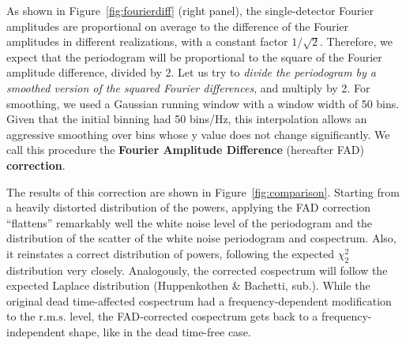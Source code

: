\documentclass[twocolumn]{aastex61}
\newcommand{\rms}{\ensuremath{\mathrm{r.m.s.}}\xspace}
\begin{document}
As shown in Figure~\ref{fig:fourierdiff} (right panel), the single-detector Fourier amplitudes are proportional on average to the difference of the Fourier amplitudes in different realizations, with a constant factor $1/\sqrt{2}$.
Therefore, we expect that the periodogram will be proportional to the square of the Fourier amplitude difference, divided by 2.
Let us try to \textit{divide the periodogram by a smoothed version of the squared Fourier differences}, and multiply by 2.
For smoothing, we used a Gaussian running window with a window width of 50 bins.
Given that the initial binning had 50 bins/Hz, this interpolation allows an aggressive smoothing over bins whose y value does not change significantly.
We call this procedure the \textbf{Fourier Amplitude Difference} (hereafter FAD) \textbf{correction}.

The results of this correction are shown in Figure~\ref{fig:comparison}. 
Starting from a heavily distorted distribution of the powers, applying the FAD correction ``flattens'' remarkably well the white noise level of the periodogram and the distribution of the scatter of the white noise periodogram and cospectrum. 
Also, it reinstates a correct distribution of powers, following the expected $\chi^2_2$ distribution \citep{Lewin+88} very closely. 
Analogously, the corrected cospectrum will follow the expected Laplace distribution (Huppenkothen \& Bachetti, sub.).
While the original dead time-affected cospectrum had a frequency-dependent modification to the \rms level, the FAD-corrected cospectrum gets back to a frequency-independent shape, like in the dead time-free case.

\end{document}
